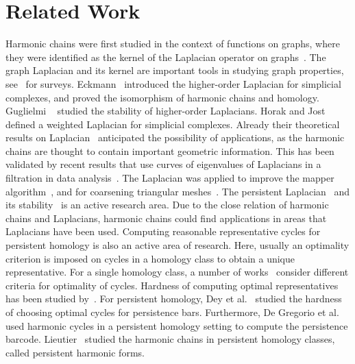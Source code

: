 


\section{Related Work}
\label{sec:related-work}

Harmonic chains were first studied in the context of functions on graphs, where they were identified as the kernel of the Laplacian operator on graphs~\cite{Kirchhoff1847}. 
The graph Laplacian and its kernel are important tools in studying graph properties, see~\cite{Merris1994,MoharAlaviChartrand1991} for surveys. 
Eckmann~\cite{Eckmann1944} introduced the higher-order Laplacian for simplicial complexes, and proved the isomorphism of harmonic chains and homology. 
Guglielmi \etal~\cite{GuglielmiSavostianovTudisco2023} studied the stability of higher-order Laplacians. Horak and Jost~\cite{HorakJost2013} defined a weighted Laplacian for simplicial complexes. Already their theoretical results on Laplacian~\cite{HorakJost2013} anticipated the possibility of applications, as the harmonic chains are thought to contain important geometric information.
This has been validated by recent results that use curves of eigenvalues of Laplacians in a filtration in data analysis~\cite{ChenQiuWang2022, WangNguyenWei2020}. 
The Laplacian was applied to improve the mapper algorithm~\cite{MikePerea2019}, and for coarsening triangular meshes~\cite{KerosSubr2023}. 
The persistent Laplacian~\cite{MemoliWanWang2022} and its stability~\cite{LiuLiWu2023} is an active research area. 
Due to the close relation of harmonic chains and Laplacians, harmonic chains could find applications in areas that Laplacians have been used.
Computing reasonable representative cycles for persistent homology is also an active area of research. 
Here, usually an optimality criterion is imposed on cycles in a homology class to obtain a unique representative. For a single homology class, a number of works~\cite{Chen2010,DeyHiraniKrishnamoorthy2010, DeyHouMandal2020, Obayashi2018,Oleksiy2010, ChambersParsaSchreiber2022, ChenFreedman2011, DeyHiraniKrishnamoorthy2010, LeeChungChoi2019} consider different criteria for optimality of cycles. Hardness of computing optimal representatives has been studied by~\cite{ChenFreedman2011, chambers2019minimum, Chambers2009, ChambersParsaSchreiber2022, Borradaile2020, Grochow2018, DeyHouMandal2020}. For persistent homology, Dey et al.~\cite{DeyHouMandal2020} studied the hardness of choosing optimal cycles for persistence bars. 
Furthermore, De Gregorio et al.~\cite{DeGregorioGuerraScaramuccia2021} used harmonic cycles in a persistent homology setting to compute the persistence barcode. Lieutier~\cite{Lieutier} studied the harmonic chains in persistent homology classes, called persistent harmonic forms.

